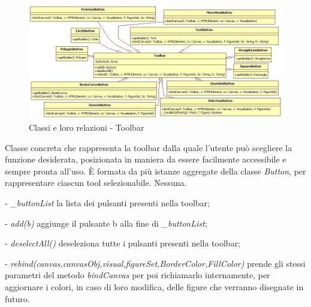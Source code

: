 \begin{figure}[!ht]
\centering
\includegraphics[scale=0.5]{toolbar.jpg}
\caption{Classi e loro relazioni - Toolbar}
\end{figure}

Classe concreta che rappresenta la toolbar dalla quale l'utente pu\` o scegliere la funzione desiderata, posizionata in maniera da essere facilmente accessibile e sempre pronta all'uso.
\` E formata da pi\`u istanze aggregate della classe \textit{Button}, per rappresentare ciascun tool selezionabile. 
Nessuna.
\begin{elencopuntato}[\subsubsecindent]
\item[-] \textit{{\_}buttonList} la lista dei pulsanti presenti nella toolbar;
\end{elencopuntato}
\begin{elencopuntato}[\subsubsecindent]
\item[-]  \textit{add(b)} aggiunge il pulsante b alla fine di \textit{{\_}buttonList};
\item[-] \textit{deselectAll()} deseleziona tutte i pulsanti presenti nella toolbar;
\item[-] \textit{rebind(canvas,canvasObj,visual,figureSet,BorderColor,FillColor)} prende gli stessi parametri del metodo \textit{bindCanvas} per poi richiamarlo internamente, per aggiornare i colori, in caso di loro modifica, delle figure che verranno disegnate in futuro.
\end{elencopuntato}

